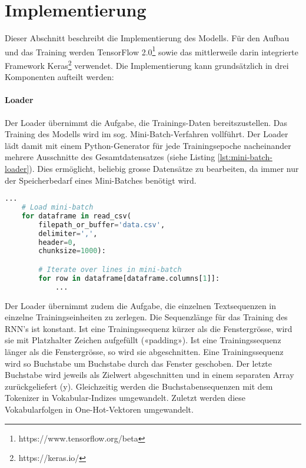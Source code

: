 \section{Implementierung}
\label{sec:model-implementation}

Dieser Abschnitt beschreibt die Implementierung des Modells.
Für den Aufbau und das Training werden TensorFlow 2.0\footnote{https://www.tensorflow.org/beta} sowie das mittlerweile darin integrierte Framework Keras\footnote{https://keras.io/} verwendet.
Die Implementierung kann grundsätzlich in drei Komponenten aufteilt werden:

\paragraph{Loader} Der Loader übernimmt die Aufgabe, die Trainings-Daten bereitszustellen.
Das Training des Modells wird im sog. Mini-Batch-Verfahren vollführt.
Der Loader lädt damit mit einem Python-Generator für jede Trainingsepoche nacheinander mehrere Ausschnitte des Gesamtdatensatzes (siehe Listing \ref{lst:mini-batch-loader}).
Dies ermöglicht, beliebig grosse Datensätze zu bearbeiten, da immer nur der Speicherbedarf eines Mini-Batches benötigt wird.

\begin{lstlisting}[language=Python, caption=Mini-Batch Loader, label=lst:mini-batch-loader]
    ...
    # Load mini-batch
    for dataframe in read_csv(
        filepath_or_buffer='data.csv',
        delimiter=',',
        header=0,
        chunksize=1000):

        # Iterate over lines in mini-batch
        for row in dataframe[dataframe.columns[1]]:
            ...
\end{lstlisting}

Der Loader übernimmt zudem die Aufgabe, die einzelnen Textsequenzen in einzelne Trainingseinheiten zu zerlegen.
Die Sequenzlänge für das Training des RNN's ist konstant.
Ist eine Trainingssequenz kürzer als die Fenstergrösse, wird sie mit Platzhalter Zeichen aufgefüllt («padding»).
Ist eine Trainingssequenz länger als die Fenstergrösse, so wird sie abgeschnitten.
Eine Trainingssequenz wird so Buchstabe um Buchstabe durch das Fenster geschoben.
Der letzte Buchstabe wird jeweils als Zielwert abgeschnitten und in einem separaten Array zurückgeliefert (y).
Gleichzeitig werden die Buchstabensequenzen mit dem Tokenizer in Vokabular-Indizes umgewandelt.
Zuletzt werden diese Vokabularfolgen in One-Hot-Vektoren umgewandelt.


